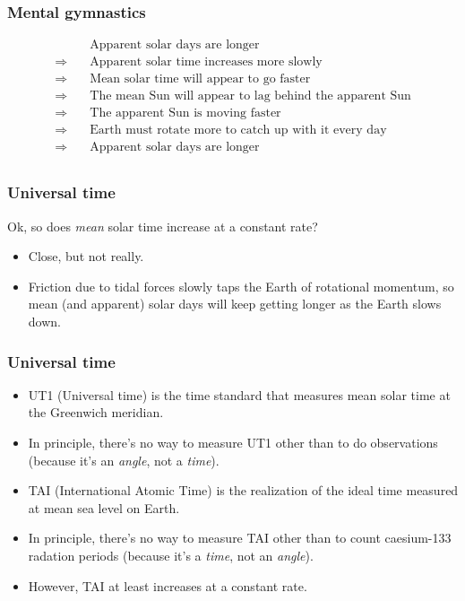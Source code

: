 \documentclass{beamer}
\begin{document}
\begin{frame}
  \frametitle{Mental gymnastics}

  \begin{align*}
    & \quad \text{Apparent solar days are longer} \\
    \Rightarrow & \quad \text{Apparent solar time increases more slowly} \\
    \Rightarrow & \quad \text{Mean solar time will appear to go faster} \\
    \Rightarrow & \quad \text{The mean Sun will appear to lag behind the apparent Sun} \\
    \Rightarrow & \quad \text{The apparent Sun is moving faster} \\
    \Rightarrow & \quad \text{Earth must rotate more to catch up with it every day} \\
    \Rightarrow & \quad \text{Apparent solar days are longer} \\
  \end{align*}
\end{frame}

\begin{frame}
  \frametitle{Universal time}

  Ok, so does \emph{mean} solar time increase at a constant rate?

  \begin{itemize}
  \item Close, but not really.
  \item Friction due to tidal forces slowly taps the Earth of rotational
    momentum, so mean (and apparent) solar days will keep getting longer as the
    Earth slows down.
  \end{itemize}
\end{frame}

\begin{frame}
  \frametitle{Universal time}

  \begin{itemize}
  \item UT1 (Universal time) is the time standard that measures mean solar time
    at the Greenwich meridian.
  \item In principle, there's no way to measure UT1 other than to do
    observations (because it's an \emph{angle}, not a \emph{time}).
  \item TAI (International Atomic Time) is the realization of the ideal time
    measured at mean sea level on Earth.
  \item In principle, there's no way to measure TAI other than to count
    caesium-133 radation periods (because it's a \emph{time}, not an
    \emph{angle}).
  \item However, TAI at least increases at a constant rate.
  \end{itemize}
\end{frame}
\end{document}
